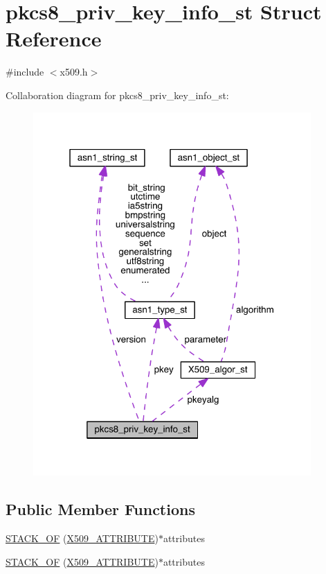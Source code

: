 \hypertarget{structpkcs8__priv__key__info__st}{}\section{pkcs8\+\_\+priv\+\_\+key\+\_\+info\+\_\+st Struct Reference}
\label{structpkcs8__priv__key__info__st}


{\ttfamily \#include $<$x509.\+h$>$}



Collaboration diagram for pkcs8\+\_\+priv\+\_\+key\+\_\+info\+\_\+st\+:\nopagebreak
\begin{figure}[H]
\begin{center}
\leavevmode
\includegraphics[width=301pt]{structpkcs8__priv__key__info__st__coll__graph}
\end{center}
\end{figure}
\subsection*{Public Member Functions}
\begin{DoxyCompactItemize}
\item 
\hyperlink{structpkcs8__priv__key__info__st_a68a742d5b82cbd7ef7e8fbbedbca6dc5}{S\+T\+A\+C\+K\+\_\+\+OF} (\hyperlink{crypto_2x509_2x509_8h_aa4f1a62a9d2dd8cb6780fe2713737c0f}{X509\+\_\+\+A\+T\+T\+R\+I\+B\+U\+TE})$\ast$attributes
\item 
\hyperlink{structpkcs8__priv__key__info__st_a68a742d5b82cbd7ef7e8fbbedbca6dc5}{S\+T\+A\+C\+K\+\_\+\+OF} (\hyperlink{crypto_2x509_2x509_8h_aa4f1a62a9d2dd8cb6780fe2713737c0f}{X509\+\_\+\+A\+T\+T\+R\+I\+B\+U\+TE})$\ast$attributes
\end{DoxyCompactItemize}
